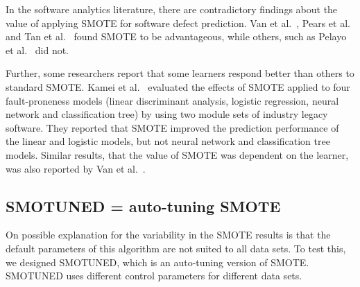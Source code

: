 \documentclass[10pt,conference]{IEEEtran}
\theoremstyle{break}
\theoremstyle{break}
\begin{document}
 


In the software analytics literature, there are contradictory findings about
the value of applying SMOTE for software defect prediction.
Van et al.~\cite{van2007experimental}, Pears et al.~\cite{pears2014synthetic} and Tan et al.~\cite{tan2015online} found SMOTE to be advantageous, while others, such as Pelayo et al.~\cite{pelayo2007applying} did not. 

Further, some researchers report that some learners respond better than others to standard SMOTE. Kamei et al.~\cite{kamei2007effects} evaluated the effects of SMOTE applied to  four fault-proneness models
(linear discriminant analysis, logistic regression, neural network and classification tree) by
using two module sets of industry legacy software. They reported that SMOTE improved the prediction performance of the linear and logistic models, but not neural network and classification tree models. Similar results, that the value of SMOTE was dependent on the learner,
was also reported by Van et al.~\cite{van2007experimental}.

\subsection{SMOTUNED = auto-tuning SMOTE}
\label{sect:smotuned}

On possible explanation for the variability in the SMOTE results is that the
default parameters of this algorithm are not suited to all data sets. To test this,
we designed SMOTUNED, which is an auto-tuning version of SMOTE.   SMOTUNED
uses different control parameters for different data sets.
\end{document}
